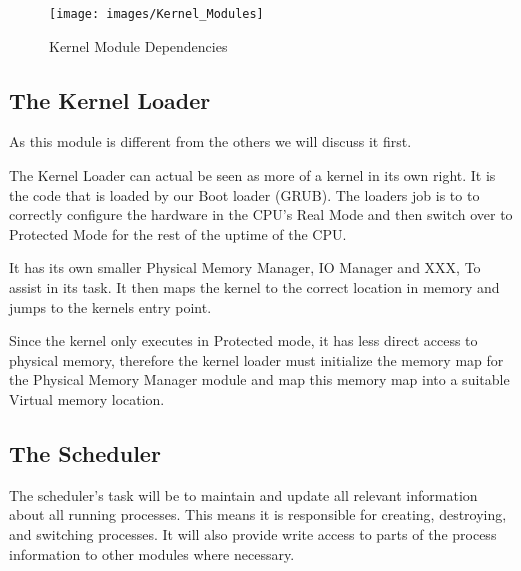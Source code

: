 \documentclass[a4paper]{report}
\begin{document}
\begin{figure}[ht]
\centering
\texttt{[image: images/Kernel\_Modules]}
\caption{Kernel Module Dependencies}
\label{fig:WinTitleBarScreen}
\end{figure}


\subsection{The Kernel Loader}

As this module is different from the others we will discuss it first.

The Kernel Loader can actual be seen as more of a kernel in its own right. It is the code that is loaded by our Boot loader (GRUB). The loaders job is to to correctly configure the hardware in the CPU's Real Mode and then switch over to Protected Mode for the rest of the uptime of the CPU.

It has its own smaller Physical Memory Manager, IO Manager and XXX, To assist in its task. It then maps the kernel to the correct location in memory and jumps to the kernels entry point.

Since the kernel only executes in Protected mode, it has less direct access to physical memory, therefore the kernel loader must initialize the memory map for the Physical Memory Manager module and map this memory map into a suitable Virtual memory location.

\subsection{The Scheduler}

The scheduler's task will be to maintain and update all relevant information about all running processes. This means it is responsible for creating, destroying, and switching processes. It will also provide write access to parts of the process information to other modules where necessary.
\end{document}
